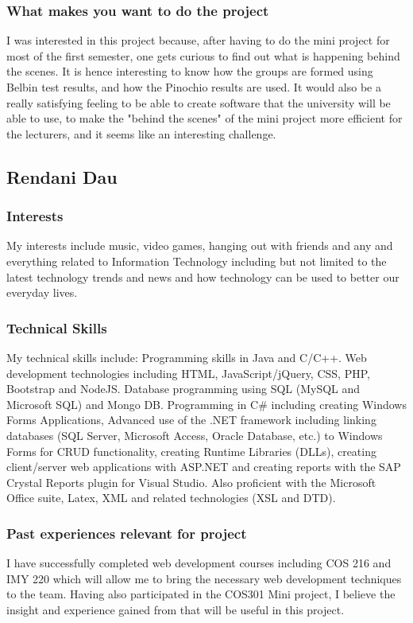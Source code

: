 \documentclass[hidelinks, 12pt, oneside]{article}
\begin{document}
\subsubsection{What makes you want to do the project} 
I was interested in this project because, after having to do the mini project for most of the first semester, one gets curious to find out what is happening behind the scenes. It is hence interesting to know how the groups are formed using Belbin test results, and how the Pinochio results are used. It would also be a really satisfying feeling to be able to create software that the university will be able to use, to make the "behind the scenes" of the mini project more efficient for the lecturers, and it seems like an interesting challenge.
\\

\subsection{Rendani Dau}
\subsubsection{Interests}
My interests include music, video games, hanging out with friends and any and everything related to Information Technology including but not limited to the latest technology trends and news and how technology can be used to better our everyday lives.
\subsubsection{Technical Skills}
My technical skills include: Programming skills in Java and C/C++. Web development technologies including HTML, JavaScript/jQuery, CSS, PHP, Bootstrap and NodeJS. Database programming using SQL (MySQL and Microsoft SQL) and Mongo DB. Programming in C\# including creating Windows Forms Applications, Advanced use of the .NET framework including linking databases (SQL Server, Microsoft Access, Oracle Database, etc.) to Windows Forms for CRUD functionality, creating Runtime Libraries (DLLs), creating client/server web applications with ASP.NET and creating reports with the SAP Crystal Reports plugin for Visual Studio. Also proficient with the Microsoft Office suite, Latex, XML and related technologies (XSL and DTD).
\subsubsection{Past experiences relevant for project}
I have successfully completed web development courses including COS 216 and IMY 220 which will allow me to bring the necessary web development techniques to the team. Having also participated in the COS301 Mini project, I believe the insight and experience gained from that will be useful in this project.
\end{document}
